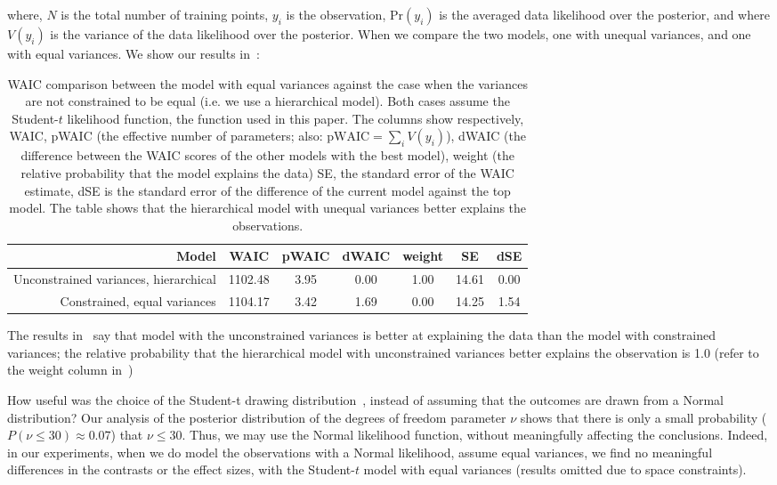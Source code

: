 where, $N$ is the total number of training points, $y_i$ is the observation, $\mathrm{Pr}(y_i)$ is the averaged data likelihood over the posterior, and where $V(y_i)$ is the variance of the data likelihood over the posterior. When we compare the two models, one with unequal variances, and one with equal variances. We show our results in~:


\begin{table}[htb]%
    \centering
        \caption{WAIC comparison between the model with equal variances against the case when the variances are not constrained to be equal (i.e. we use a hierarchical model). Both cases assume the Student-$t$ likelihood function, the function used in this paper. The columns show respectively, WAIC, pWAIC (the effective number of parameters; also: $\mathrm{pWAIC}=\sum_i V(y_i)$), dWAIC (the difference between the WAIC scores of the other models with the best model), weight (the relative probability that the model explains the data) SE, the standard error of the WAIC estimate, dSE is the standard error of the difference of the current model against the top model. The table shows that the hierarchical model with unequal variances better explains the observations. }\label{tab:WAIC comparison}
        \begin{tabular}{rcccccc} \toprule
            Model & WAIC & pWAIC & dWAIC & weight & SE & dSE \\ \midrule
             Unconstrained variances, hierarchical    & 1102.48    & 3.95 &     0.00 &     1.00 &     14.61 &     0.00    \\
            Constrained, equal variances & 1104.17 & 3.42 & 1.69 & 0.00 & 14.25 & 1.54        \\ \bottomrule
        \end{tabular}
    
    \end{table}

The results in~ say that model with the unconstrained variances is better at explaining the data than the model with constrained variances; the relative probability that the hierarchical model with unconstrained variances better explains the observation is 1.0 (refer to the weight column in~)

How useful was the choice of the Student-t drawing distribution~, instead of assuming that the outcomes are drawn from a Normal distribution? Our analysis of the posterior distribution of the degrees of freedom parameter $\nu$ shows that there is only a small probability ($P(\nu \leq 30) \approx 0.07$) that $\nu \leq 30$. Thus, we may use the Normal likelihood function, without meaningfully affecting the conclusions. Indeed, in our experiments, when we do model the observations with a Normal likelihood, assume equal variances, we find no meaningful differences in the contrasts or the effect sizes, with the Student-$t$ model with equal variances (results omitted due to space constraints).

